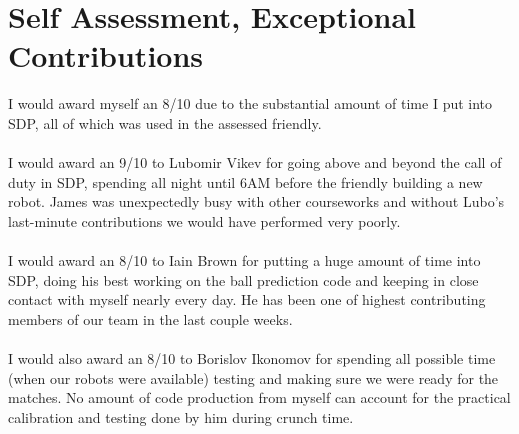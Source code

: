 \documentclass[a4paper,11pt]{article}
\begin{document}

\section{Self Assessment, Exceptional Contributions}

I would award myself an 8/10 due to the substantial amount of time I put into SDP, all of which was used in the assessed friendly.\\
\\
I would award an 9/10 to Lubomir Vikev for going above and beyond the call of duty in SDP, spending all night until 6AM before the friendly building a new robot. James was unexpectedly busy with other courseworks and without Lubo's last-minute contributions we would have performed very poorly.\\
\\

I would award an 8/10 to Iain Brown for putting a huge amount of time into SDP, doing his best working on the ball prediction code and keeping in close contact with myself nearly every day. He has been one of highest contributing members of our team in the last couple weeks.\\
\\

I would also award an 8/10 to Borislov Ikonomov for spending all possible time (when our robots were available) testing and making sure we were ready for the matches. No amount of code production from myself can account for the practical calibration and testing done by him during crunch time.


\end{document}
